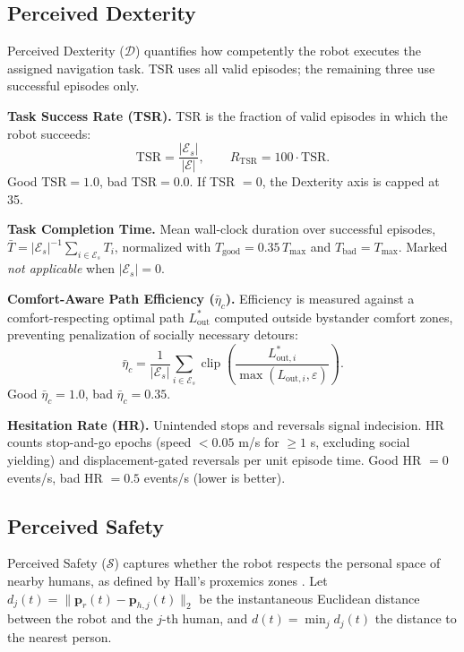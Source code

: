 \documentclass[conference]{IEEEtran}
\begin{document}
\subsection{Perceived Dexterity}

Perceived Dexterity ($\mathcal{D}$) quantifies how competently the robot
executes the assigned navigation task.
TSR uses all valid episodes; the remaining three use successful episodes only.

\textbf{Task Success Rate (TSR).}
TSR is the fraction of valid episodes in which the robot succeeds:
\begin{equation}
	\text{TSR} = \frac{|\mathcal{E}_s|}{|\mathcal{E}|}, \qquad
	R_\text{TSR} = 100 \cdot \text{TSR}.
\end{equation}
Good $\text{TSR} = 1.0$, bad $\text{TSR} = 0.0$.
If TSR $= 0$, the Dexterity axis is capped at 35.

\textbf{Task Completion Time.}
Mean wall-clock duration over successful episodes,
$\bar{T} = |\mathcal{E}_s|^{-1}\sum_{i \in \mathcal{E}_s} T_i$,
normalized with $T_\text{good} = 0.35\,T_{\max}$ and $T_\text{bad} = T_{\max}$.
Marked \textit{not applicable} when $|\mathcal{E}_s| = 0$.

\textbf{Comfort-Aware Path Efficiency ($\bar\eta_c$).}
Efficiency is measured against a comfort-respecting optimal path $L^*_\text{out}$
computed outside bystander comfort zones, preventing penalization of socially
necessary detours:
\begin{equation}
	\bar{\eta}_c = \frac{1}{|\mathcal{E}_s|}
	\sum_{i \in \mathcal{E}_s}
	\operatorname{clip}\!\left(\frac{L^*_{\text{out},i}}{\max(L_{\text{out},i},\varepsilon)}\right).
\end{equation}
Good $\bar\eta_c = 1.0$, bad $\bar\eta_c = 0.35$.

\textbf{Hesitation Rate (HR).}
Unintended stops and reversals signal indecision.
HR counts stop-and-go epochs (speed $< 0.05$ m/s for $\ge 1$ s, excluding
social yielding) and displacement-gated reversals per unit episode time.
Good HR $= 0$ events/s, bad HR $= 0.5$ events/s (lower is better).

\subsection{Perceived Safety}

Perceived Safety ($\mathcal{S}$) captures whether the robot respects the personal space of
nearby humans, as defined by Hall's proxemics zones \cite{hall1966hidden}.
Let $d_j(t) = \|\mathbf{p}_r(t) - \mathbf{p}_{h,j}(t)\|_2$ be the
instantaneous Euclidean distance between the robot and the $j$-th human,
and $d(t) = \min_j d_j(t)$ the distance to the nearest person.
\end{document}
